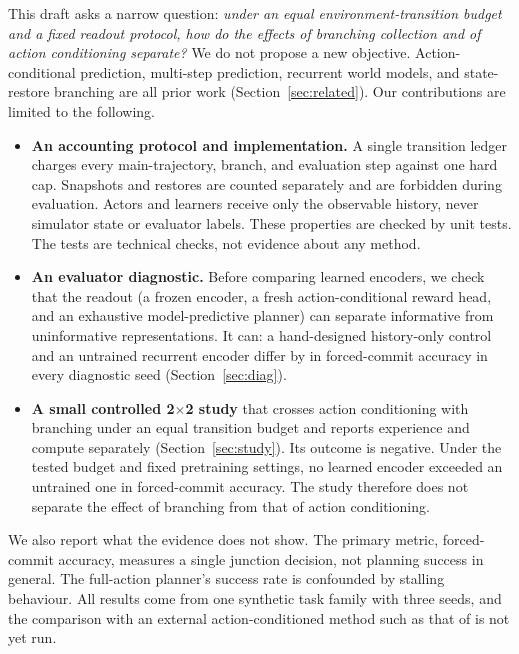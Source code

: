 This draft asks a narrow question: \emph{under an equal environment-transition budget and a fixed readout protocol, how do the effects of branching collection and of action conditioning separate?} We do not propose a new objective. Action-conditional prediction, multi-step prediction, recurrent world models, and state-restore branching are all prior work (Section~\ref{sec:related}). Our contributions are limited to the following.
\begin{itemize}
  \item \textbf{An accounting protocol and implementation.} A single transition ledger charges every main-trajectory, branch, and evaluation step against one hard cap. Snapshots and restores are counted separately and are forbidden during evaluation. Actors and learners receive only the observable history, never simulator state or evaluator labels. These properties are checked by unit tests. The tests are technical checks, not evidence about any method.
  \item \textbf{An evaluator diagnostic.} Before comparing learned encoders, we check that the readout (a frozen encoder, a fresh action-conditional reward head, and an exhaustive model-predictive planner) can separate informative from uninformative representations. It can: a hand-designed history-only control and an untrained recurrent encoder differ by \DiagHeadroomMin{} in forced-commit accuracy in every diagnostic seed (Section~\ref{sec:diag}).
  \item \textbf{A small controlled 2$\times$2 study} that crosses action conditioning with branching under an equal transition budget and reports experience and compute separately (Section~\ref{sec:study}). Its outcome is negative. Under the tested budget and fixed pretraining settings, no learned encoder exceeded an untrained one in forced-commit accuracy. The study therefore does not separate the effect of branching from that of action conditioning.
\end{itemize}
We also report what the evidence does not show. The primary metric, forced-commit accuracy, measures a single junction decision, not planning success in general. The full-action planner's success rate is confounded by stalling behaviour. All results come from one synthetic task family with three seeds, and the comparison with an external action-conditioned method such as that of \citet{kwon2024future} is not yet run.
